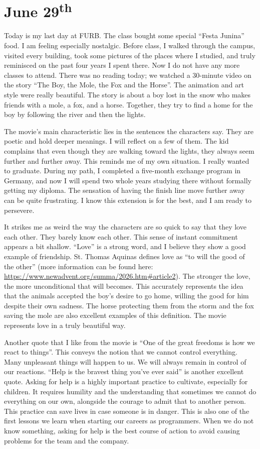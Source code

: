 \section[June 29]{June 29\textsuperscript{th}}
Today is my last day at FURB. The class bought some special ``Festa Junina'' food. I am feeling especially nostalgic. Before class, I walked through the campus, visited every building, took some pictures of the places where I studied, and truly reminisced on the past four years I spent there. Now I do not have any more classes to attend. There was no reading today; we watched a 30-minute video on the story ``The Boy, the Mole, the Fox and the Horse''. The animation and art style were really beautiful. The story is about a boy lost in the snow who makes friends with a mole, a fox, and a horse. Together, they try to find a home for the boy by following the river and then the lights. 

The movie's main characteristic lies in the sentences the characters say. They are poetic and hold deeper meanings. I will reflect on a few of them. The kid complains that even though they are walking toward the lights, they always seem further and further away. This reminds me of my own situation. I really wanted to graduate. During my path, I completed a five-month exchange program in Germany, and now I will spend two whole years studying there without formally getting my diploma. The sensation of having the finish line move further away can be quite frustrating. I know this extension is for the best, and I am ready to persevere.

It strikes me as weird the way the characters are so quick to say that they love each other. They barely know each other. This sense of instant commitment appears a bit shallow. ``Love'' is a strong word, and I believe they show a good example of friendship. St. Thomas Aquinas defines love as ``to will the good of the other'' (more information can be found here: \url{https://www.newadvent.org/summa/2026.htm#article2}). The stronger the love, the more unconditional that will becomes. This accurately represents the idea that the animals accepted the boy's desire to go home, willing the good for him despite their own sadness. The horse protecting them from the storm and the fox saving the mole are also excellent examples of this definition. The movie represents love in a truly beautiful way.

Another quote that I like from the movie is ``One of the great freedoms is how we react to things''. This conveys the notion that we cannot control everything. Many unpleasant things will happen to us. We will always remain in control of our reactions. ``Help is the bravest thing you've ever said'' is another excellent quote. Asking for help is a highly important practice to cultivate, especially for children. It requires humility and the understanding that sometimes we cannot do everything on our own, alongside the courage to admit that to another person. This practice can save lives in case someone is in danger. This is also one of the first lessons we learn when starting our careers as programmers. When we do not know something, asking for help is the best course of action to avoid causing problems for the team and the company.

